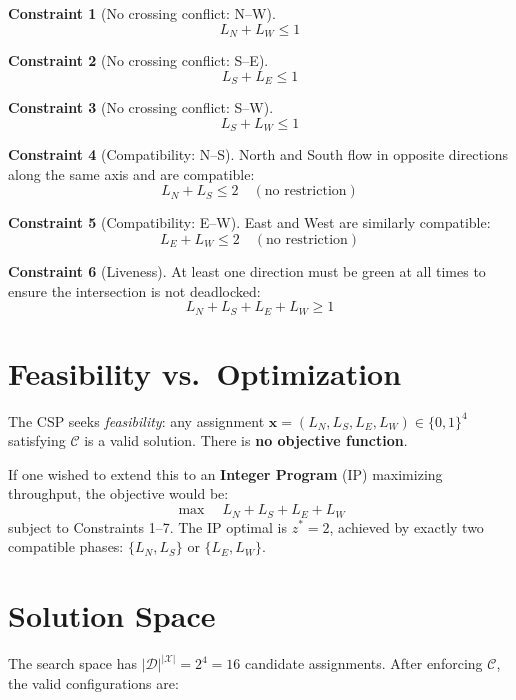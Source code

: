 \documentclass{article}
\theoremstyle{definition}
\newtheorem{constraint}{Constraint}
\begin{document}
\begin{constraint}[No crossing conflict: N--W]
\[
  L_N + L_W \leq 1
\]
\end{constraint}

\begin{constraint}[No crossing conflict: S--E]
\[
  L_S + L_E \leq 1
\]
\end{constraint}

\begin{constraint}[No crossing conflict: S--W]
\[
  L_S + L_W \leq 1
\]
\end{constraint}

\begin{constraint}[Compatibility: N--S]
North and South flow in opposite directions along the same axis and
are compatible:
\[
  L_N + L_S \leq 2 \quad (\text{no restriction})
\]
\end{constraint}

\begin{constraint}[Compatibility: E--W]
East and West are similarly compatible:
\[
  L_E + L_W \leq 2 \quad (\text{no restriction})
\]
\end{constraint}

\begin{constraint}[Liveness]
At least one direction must be green at all times to ensure the
intersection is not deadlocked:
\[
  L_N + L_S + L_E + L_W \geq 1
\]
\end{constraint}

\section{Feasibility vs.\ Optimization}

The CSP seeks \emph{feasibility}: any assignment
$\mathbf{x} = (L_N, L_S, L_E, L_W) \in \{0,1\}^4$
satisfying $\mathcal{C}$ is a valid solution.
There is \textbf{no objective function}.

If one wished to extend this to an \textbf{Integer Program} (IP)
maximizing throughput, the objective would be:
\[
  \max \quad L_N + L_S + L_E + L_W
\]
subject to Constraints 1--7.
The IP optimal is $z^* = 2$, achieved by exactly two compatible
phases: $\{L_N, L_S\}$ or $\{L_E, L_W\}$.

\section{Solution Space}

The search space has $|\mathcal{D}|^{|\mathcal{X}|} = 2^4 = 16$ candidate
assignments. After enforcing $\mathcal{C}$, the valid configurations are:
\end{document}
